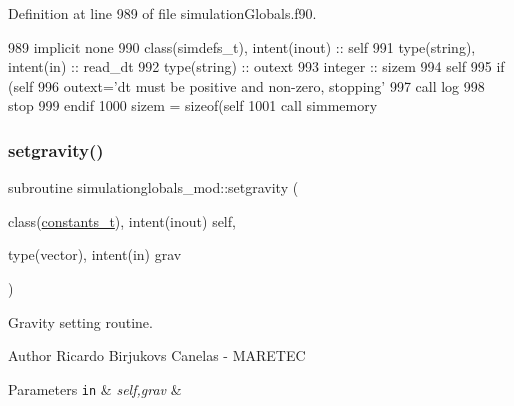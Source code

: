 Definition at line 989 of file simulation\+Globals.\+f90.


\begin{DoxyCode}
989     \textcolor{keywordtype}{implicit none}
990     \textcolor{keywordtype}{class}(simdefs\_t), \textcolor{keywordtype}{intent(inout)} :: self
991     \textcolor{keywordtype}{type}(string), \textcolor{keywordtype}{intent(in)} :: read\_dt
992     \textcolor{keywordtype}{type}(string) :: outext
993     \textcolor{keywordtype}{integer} :: sizem
994     self%
995     \textcolor{keywordflow}{if} (self%
996         outext=\textcolor{stringliteral}{'dt must be positive and non-zero, stopping'}
997         \textcolor{keyword}{call }log%
998         stop
999 \textcolor{keywordflow}{    endif}
1000     sizem = sizeof(self%
1001     \textcolor{keyword}{call }simmemory%
\end{DoxyCode}
\mbox{\label{namespacesimulationglobals__mod_ae6b88d15ddc389aedd73d600de0337df}} 
\subsubsection{\texorpdfstring{setgravity()}{setgravity()}}
{\footnotesize\ttfamily subroutine simulationglobals\+\_\+mod\+::setgravity (\begin{DoxyParamCaption}\item[{class(\mbox{\hyperlink{structsimulationglobals__mod_1_1constants__t}{constants\+\_\+t}}), intent(inout)}]{self,  }\item[{type(vector), intent(in)}]{grav }\end{DoxyParamCaption})\hspace{0.3cm}{\ttfamily [private]}}



Gravity setting routine. 

\begin{DoxyAuthor}{Author}
Ricardo Birjukovs Canelas -\/ M\+A\+R\+E\+T\+EC 
\end{DoxyAuthor}

\begin{DoxyParams}[1]{Parameters}
\mbox{\tt in}  & {\em self,grav} & \\
\hline
\end{DoxyParams}



